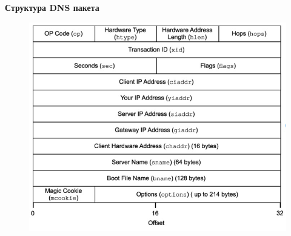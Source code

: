 \documentclass[12pt,onecolumn]{article}
\begin{document}
\textbf{Структура DNS пакета}
\begin{figure}[H]
    \centering
    \includegraphics*[width=\textwidth]{image/part10/dhcp-structure.jpg}
\end{figure}
\end{document}
